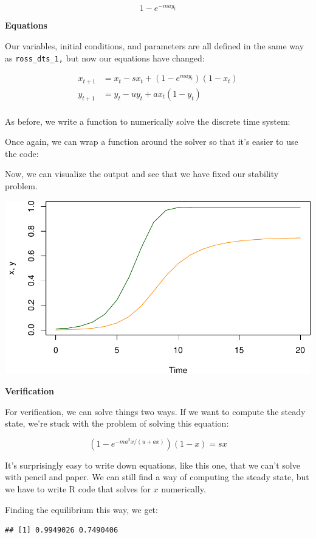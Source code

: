 \documentclass[
]{book}
\begin{document}
\[1 - e^{-m a y_t}\]

\textbf{Equations}

Our variables, initial conditions, and parameters are all defined in the same way as \texttt{ross\_dts\_1,} but now our equations have changed:

\[\begin{array}{rl}
x_{t+1} &=  x_t - s x_t + (1-e^{m a y_t}) (1-x_t)  \\ 
y_{t+1} &=  y_t - u y_t + a x_t (1 - y_t) \\ 
\end{array}\]

As before, we write a function to numerically solve the discrete time system:

Once again, we can wrap a function around the solver so that it's easier to use the code:

Now, we can visualize the output and see that we have fixed our stability problem.

\includegraphics{docs/figs/unnamed-chunk-27-1.pdf}

\textbf{Verification}

For verification, we can solve things two ways. If we want to compute the steady state, we're stuck with the problem of solving this equation:

\[(1-e^{-m a^2 x/(u + a x)}) (1-x) = sx\]

It's surprisingly easy to write down equations, like this one, that we can't solve with pencil and paper. We can still find a way of computing the steady state, but we have to write R code that solves for \(x\) numerically.

Finding the equilibrium this way, we get:

\begin{verbatim}
## [1] 0.9949026 0.7490406
\end{verbatim}
\end{document}
